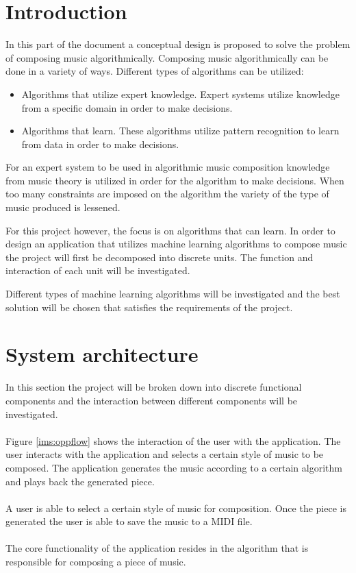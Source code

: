 

\chapter{Introduction}
In this part of the document a conceptual design is proposed to solve the problem of composing music algorithmically.
Composing music algorithmically can be done in a variety of ways. Different types of algorithms can be utilized:
\begin{itemize}
\item Algorithms that utilize expert knowledge. Expert systems utilize knowledge from a specific domain in order to make decisions.
\item Algorithms that learn. These algorithms utilize pattern recognition to learn from data in order to make decisions.
\end{itemize}
For an expert system to be used in algorithmic music composition knowledge from music theory is utilized in order for the algorithm to make decisions. When too many constraints are imposed on the algorithm the variety of the type of music produced is lessened.

For this project however, the focus is on algorithms that can learn. In order to design an application that utilizes machine learning algorithms to compose music the project will first be decomposed into discrete units. The function and interaction of each unit will be investigated. 

Different types of machine learning algorithms will be investigated and the best solution will be chosen that satisfies the requirements of the project.

\chapter{System architecture}
In this section the project will be broken down into discrete functional components and the interaction between different components will be investigated.
\\\\
Figure \ref{ims:oppflow} shows the interaction of the user with the application. 
The user interacts with the application and selects a certain style of music to be composed. The application generates the music according to a certain algorithm and plays back the generated piece. 
\\\\
A user is able to select a certain style of music for composition. Once the piece is generated the user is able to save the music to a \ac{MIDI} file.
\\\\
The core functionality of the application resides in the algorithm that is responsible for composing a piece of music.

